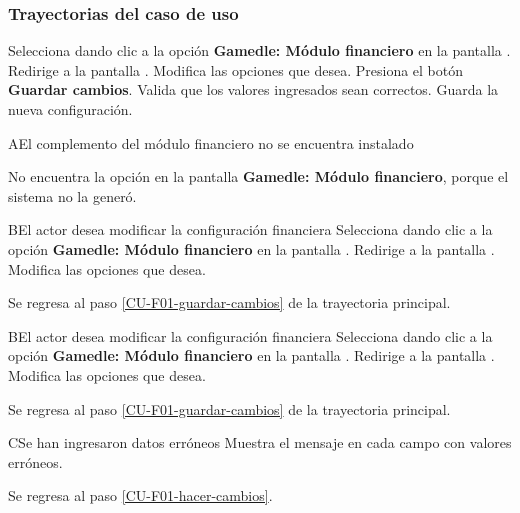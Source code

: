 \subsubsection{Trayectorias del caso de uso}

\begin{UCtrayectoria}%
%

    \Actor Selecciona dando clic a la opción \textbf{Gamedle: Módulo financiero} en la pantalla . 
    \Sistema Redirige a la pantalla .
    \Actor Modifica las opciones que desea. 
    \label{CU-F01-hacer-cambios}
    \Actor Presiona el botón \textbf{Guardar cambios}.
    \label{CU-F01-guardar-cambios}
    \Sistema Valida que los valores ingresados sean correctos. 
    \Sistema Guarda la nueva configuración.

\end{UCtrayectoria}

\begin{UCtrayectoriaA}%
  {A}{El complemento del  módulo financiero no se encuentra instalado}

  \Actor No encuentra la opción en la pantalla  \textbf{Gamedle: Módulo financiero}, porque el sistema no la generó.

\end{UCtrayectoriaA}

\begin{UCtrayectoriaA}%
{B}{El actor desea modificar la configuración financiera}
    \Actor Selecciona dando clic a la opción \textbf{Gamedle: Módulo financiero} en la pantalla .
    \Sistema Redirige a la pantalla .
    \Actor Modifica las opciones que desea.
    \item Se regresa al paso \ref{CU-F01-guardar-cambios} de la trayectoria principal.

\end{UCtrayectoriaA}

\begin{UCtrayectoriaA}%
{B}{El actor desea modificar la configuración financiera}
    \Actor Selecciona dando clic a la opción \textbf{Gamedle: Módulo financiero} en la pantalla .
    \Sistema Redirige a la pantalla .
    \Actor Modifica las opciones que desea.
    \item Se regresa al paso \ref{CU-F01-guardar-cambios} de la trayectoria principal.

\end{UCtrayectoriaA}


\begin{UCtrayectoriaA}%
{C}{Se han ingresaron datos erróneos}
    \Sistema Muestra el mensaje  en cada campo con valores erróneos.
    \item Se regresa al paso \ref{CU-F01-hacer-cambios}.

\end{UCtrayectoriaA}
